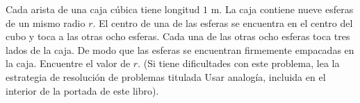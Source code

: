 \item Cada arista de una caja cúbica tiene longitud $1\text{ m}$. La caja contiene nueve esferas de un mismo radio $r$. El centro de una de las esferas se encuentra en el centro del cubo y toca a las otras ocho esferas. Cada una de las otras ocho esferas toca tres lados de la caja. De modo que las esferas se encuentran firmemente empacadas en la caja. Encuentre el valor de $r$. (Si tiene dificultades con este problema, lea la estrategia de resolución de problemas titulada Usar analogía, incluida en el interior de la portada de este libro).
